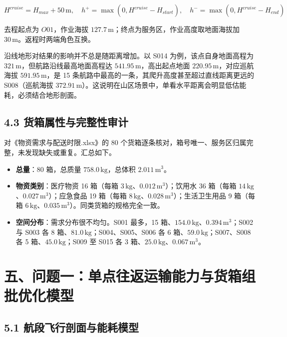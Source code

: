 \documentclass[withoutpreface,bwprint]{format}
\begin{document}
\begin{equation}
H^{cruise} = H_{max} + 50\,\text{m}, \quad h^+ = \max(0, H^{cruise} - H_{start}), \quad h^- = \max(0, H^{cruise} - H_{end})
\end{equation}

去程起点为 $O01$，作业海拔 $127.7\,\text{m}$；终点为服务区，作业高度取地面海拔加 $30\,\text{m}$。返程时两端角色互换。

沿线地形对结果的影响并不总是随距离增加。以 S014 为例，该点自身地面高程为 $321\,\text{m}$，但航路沿线最高地面高程达 $541.95\,\text{m}$，高出起点地面 $220.95\,\text{m}$，对应巡航海拔 $591.95\,\text{m}$，是 15 条航路中最高的一条，其爬升高度甚至超过直线距离更远的 S008（巡航海拔 $372.91\,\text{m}$）。这说明在山区场景中，单看水平距离会明显低估能耗，必须结合地形剖面。

\subsection{4.3 货箱属性与完整性审计}
对《物资需求与配送时限.xlsx》的 80 个货箱逐条核对，箱号唯一、服务区归属完整，未发现缺失或重复。汇总如下。

\begin{itemize}[leftmargin=*]
    \item \textbf{总量}：80 箱，总质量 $758.0\,\text{kg}$，总体积 $2.011\,\text{m}^3$。
    \item \textbf{物资类别}：医疗物资 16 箱（每箱 $3\,\text{kg}$、$0.012\,\text{m}^3$）；饮用水 36 箱（每箱 $14\,\text{kg}$、$0.027\,\text{m}^3$）；应急食品 19 箱（每箱 $8\,\text{kg}$、$0.028\,\text{m}^3$）；生活卫生用品 9 箱（每箱 $6\,\text{kg}$、$0.035\,\text{m}^3$）。同类货箱的规格完全一致。
    \item \textbf{空间分布}：需求分布很不均匀。S001 最多，15 箱、$154.0\,\text{kg}$、$0.394\,\text{m}^3$；S002 与 S003 各 8 箱、$81.0\,\text{kg}$；S004、S005、S006 各 6 箱、$59.0\,\text{kg}$；S007、S008 各 5 箱、$45.0\,\text{kg}$；S009 至 S015 各 3 箱、$25.0\,\text{kg}$、$0.067\,\text{m}^3$。
\end{itemize}



\section{五、问题一：单点往返运输能力与货箱组批优化模型}

\subsection{5.1 航段飞行剖面与能耗模型}
\end{document}
